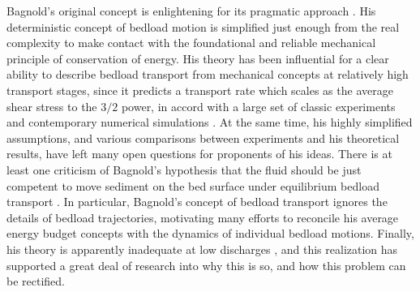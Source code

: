 \documentclass{article}
\begin{document}
Bagnold's original concept is enlightening for its pragmatic approach \citep{Ashida1972, Bagnold1973, Engelund1976, Luque1976}. 
His deterministic concept of bedload motion is simplified just enough from the real complexity to make contact with the foundational and reliable mechanical principle of conservation of energy. 
His theory has been influential for a clear ability to describe bedload transport from mechanical concepts at relatively high transport stages, since it predicts a transport rate which scales as the average shear stress to the $3/2$ power, in accord with a large set of classic experiments and contemporary numerical simulations \citep{MeyerPeter1948,Gomez1989,Schmeeckle2014, Elghannay2017}.
At the same time, his highly simplified assumptions, and various comparisons between experiments and his theoretical results, have left many open questions for proponents of his ideas. 
There is at least one criticism of Bagnold's hypothesis that the fluid should be just competent to move sediment on the bed surface under equilibrium bedload transport \citep{Seminara2002}.
In particular, Bagnold's concept of bedload transport ignores the details of bedload trajectories, motivating many efforts to reconcile his average energy budget concepts with the dynamics of individual bedload motions. 
Finally, his theory is apparently inadequate at low discharges \citep{Engelund1976, Luque1976, Francis1977, Ancey2008}, and this realization has supported a great deal of research into why this is so, and how this problem can be rectified. 
\end{document}
